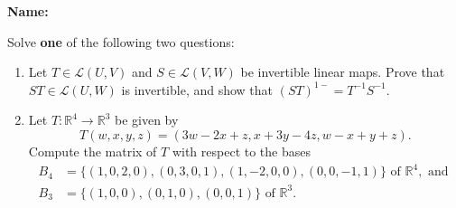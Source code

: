 \documentclass[12pt]{article}
\newcommand{\R}{\mathbb{R}}
\begin{document}
\thispagestyle{fancy}
{\bf Name:}

\bigskip

Solve {\bf one} of the following two questions:
 \begin{enumerate}
 \item  Let $T\in \mathcal{L}(U,V)$ and $S\in \mathcal{L}(V,W)$ be invertible linear maps. Prove that $ST\in \mathcal{L}(U,W)$ is invertible, and show that $(ST)^{1-} = T^{-1}S^{-1}$.

 \item Let $T:\R^4\to \R^3$ be given by
\[
 T(w,x,y,z) = (3w-2x+z,x+3y-4z,w-x+y+z).
\]
 Compute the matrix of $T$ with respect to the bases
\begin{align*}
 B_4 &= \{(1,0,2,0),(0,3,0,1), (1, -2, 0, 0), (0,0,-1,1)\} \text{ of } \R^4, \text{ and }\\
 B_3 &= \{(1,0,0),(0,1,0), (0,0,1)\} \text{ of } \R^3.
\end{align*}

 \end{enumerate}
\end{document}
